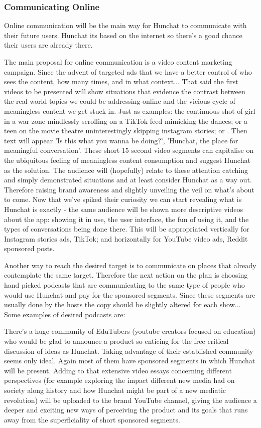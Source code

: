 \documentclass[12pt]{article}
\begin{document}
	\subsubsection{Communicating Online}
	
	Online communication will be the main way for Hunchat to communicate with their future users. Hunchat its based on the internet so there's a good chance their users are already there.
	
	The main proposal for online communication is a video content marketing campaign. Since the advent of targeted ads that we have a better control of who sees the content, how many times, and in what context... That said the first videos to be presented will show situations that evidence the contrast between the real world topics we could be addressing online and the vicious cycle of meaningless content we get stuck in. Just as examples: the continuous shot of girl in a war zone mindlessly scrolling on a TikTok feed mimicking the dances; or a teen on the movie theatre uninterestingly skipping instagram stories; or  . Then text will appear 'Is this what you wanna be doing?', 'Hunchat, the place for meaningful conversation'. These short 15 second video segments can capitalise on the ubiquitous feeling of meaningless content consumption and suggest Hunchat as the solution. The audience will (hopefully) relate to these attention catching and simply demonstrated situations and at least consider Hunchat as a way out. Therefore raising brand awareness and slightly unveiling the veil on what's about to come. Now that we've spiked their curiosity we can start revealing what is Hunchat is exactly - the same audience will be shown more descriptive videos about the app: showing it in use, the user interface, the fun of using it, and the types of conversations being done there. This will be appropriated vertically for Instagram stories ads, TikTok; and horizontally for YouTube video ads, Reddit sponsored posts.
	
	Another way to reach the desired target is to communicate on places that already contemplate the same target. Therefore the next action on the plan is choosing hand picked podcasts that are communicating to the same type of people who would use Hunchat and pay for the sponsored segments. Since these segments are usually done by the hosts the copy should be slightly altered for each show... Some examples of desired podcasts are: 
	
	There's a huge community of EduTubers (youtube creators focused on education) who would be glad to announce a product so enticing for the free critical discussion of ideas as Hunchat. Taking advantage of their established community seems only ideal. Again most of them have sponsored segments in which Hunchat will be present. Adding to that extensive video essays concerning different perspectives (for example exploring the impact different new media had on society along history and how Hunchat might be part of a new mediatic revolution) will be uploaded to the brand YouTube channel, giving the audience a deeper and exciting new ways of perceiving the product and its goals that runs away from the superficiality of short sponsored segments.
	
\end{document}
